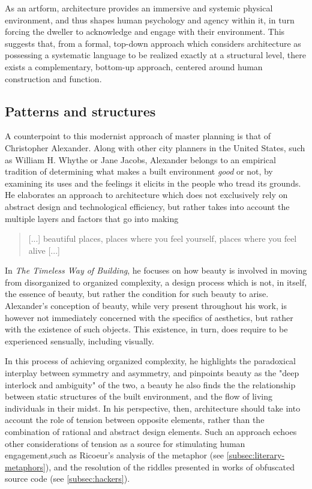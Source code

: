As an artform, architecture provides an immersive and systemic physical environment, and thus shapes human psychology and agency within it, in turn forcing the dweller to acknowledge and engage with their environment. This suggests that, from a formal, top-down approach which considers architecture as possessing a systematic language to be realized exactly at a structural level, there exists a complementary, bottom-up approach, centered around human construction and function.

\subsection{Patterns and structures}
\label{subsec:patterns-structures}

A counterpoint to this modernist approach of master planning is that of Christopher Alexander. Along with other city planners in the United States, such as William H. Whythe or Jane Jacobs, Alexander belongs to an empirical tradition of determining what makes a built environment \emph{good} or not, by examining its uses and the feelings it elicits in the people who tread its grounds. He elaborates an approach to architecture which does not exclusively rely on abstract design and technological efficiency, but rather takes into account the multiple layers and factors that go into making

\begin{quote}
    [...] beautiful places, places where you feel yourself, places where you feel alive \citep{alexander_timeless_1979} [...]
\end{quote}

In \emph{The Timeless Way of Building}, he focuses on how beauty is involved in moving from disorganized to organized complexity, a design process which is not, in itself, the essence of beauty, but rather the condition for such beauty to arise. Alexander's conception of beauty, while very present throughout his work, is however not immediately concerned with the specifics of aesthetics, but rather with the existence of such objects. This existence, in turn, does require to be experienced sensually, including visually.

In this process of achieving organized complexity, he highlights the paradoxical interplay between symmetry and asymmetry, and pinpoints beauty as the "deep interlock and ambiguity" of the two, a beauty he also finds the the relationship between static structures of the built environment, and the flow of living individuals in their midst. In his perspective, then, architecture should take into account the role of tension between opposite elements, rather than the combination of rational and abstract design elements. Such an approach echoes other considerations of tension as a source for stimulating human engagement,such as Ricoeur's analysis of the metaphor (see \autoref{subsec:literary-metaphors}), and the resolution of the riddles presented in works of obfuscated source code (see \autoref{subsec:hackers}).

